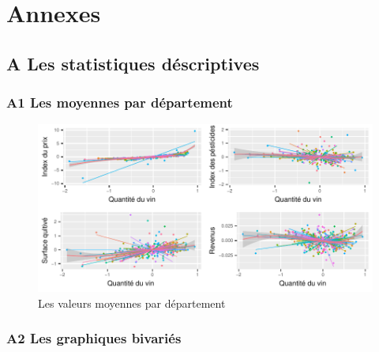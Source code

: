 \documentclass[11pt,]{article}
\begin{document}
\FloatBarrier

\newpage

\hypertarget{annexes}{%
\section{Annexes}\label{annexes}}

\hypertarget{a-les-statistiques-descriptives}{%
\subsection{A Les statistiques
déscriptives}\label{a-les-statistiques-descriptives}}

\hypertarget{a1-les-moyennes-par-departement}{%
\subsubsection{A1 Les moyennes par
département}\label{a1-les-moyennes-par-departement}}

\FloatBarrier

\begin{figure}[!htbp]

{\centering \includegraphics{note2pres_files/figure-latex/unnamed-chunk-53-1} 

}

\caption{Les valeurs moyennes par département}\label{fig:unnamed-chunk-53}
\end{figure}

\FloatBarrier

\newpage

\hypertarget{a2-les-graphiques-bivaries}{%
\subsubsection{A2 Les graphiques
bivariés}\label{a2-les-graphiques-bivaries}}
\end{document}
